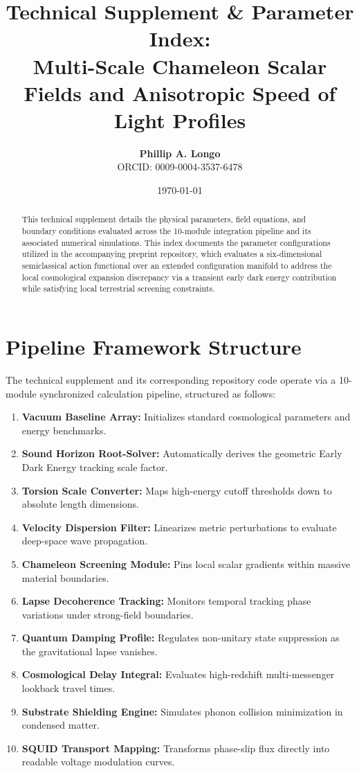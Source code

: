 \documentclass[11pt,a4paper]{article}
\title{\textbf{Technical Supplement \& Parameter Index:\\
		Multi-Scale Chameleon Scalar Fields and Anisotropic Speed of Light Profiles}}
\author{\textbf{Phillip A. Longo} \\ ORCID: 0009-0004-3537-6478}
\date{\today}
\begin{document}
	
	\maketitle
	
	\begin{abstract}
		This technical supplement details the physical parameters, field equations, and boundary conditions evaluated across the 10-module integration pipeline and its associated numerical simulations. This index documents the parameter configurations utilized in the accompanying preprint repository, which evaluates a six-dimensional semiclassical action functional over an extended configuration manifold to address the local cosmological expansion discrepancy via a transient early dark energy contribution while satisfying local terrestrial screening constraints.
	\end{abstract}
	\section{Pipeline Framework Structure}
	The technical supplement and its corresponding repository code operate via a 10-module synchronized calculation pipeline, structured as follows:
	\begin{enumerate}
		\item \textbf{Vacuum Baseline Array:} Initializes standard cosmological parameters and energy benchmarks.
		\item \textbf{Sound Horizon Root-Solver:} Automatically derives the geometric Early Dark Energy tracking scale factor.
		\item \textbf{Torsion Scale Converter:} Maps high-energy cutoff thresholds down to absolute length dimensions.
		\item \textbf{Velocity Dispersion Filter:} Linearizes metric perturbations to evaluate deep-space wave propagation.
		\item \textbf{Chameleon Screening Module:} Pins local scalar gradients within massive material boundaries.
		\item \textbf{Lapse Decoherence Tracking:} Monitors temporal tracking phase variations under strong-field boundaries.
		\item \textbf{Quantum Damping Profile:} Regulates non-unitary state suppression as the gravitational lapse vanishes.
		\item \textbf{Cosmological Delay Integral:} Evaluates high-redshift multi-messenger lookback travel times.
		\item \textbf{Substrate Shielding Engine:} Simulates phonon collision minimization in condensed matter.
		\item \textbf{SQUID Transport Mapping:} Transforms phase-slip flux directly into readable voltage modulation curves.
	\end{enumerate}
	
\end{document}
